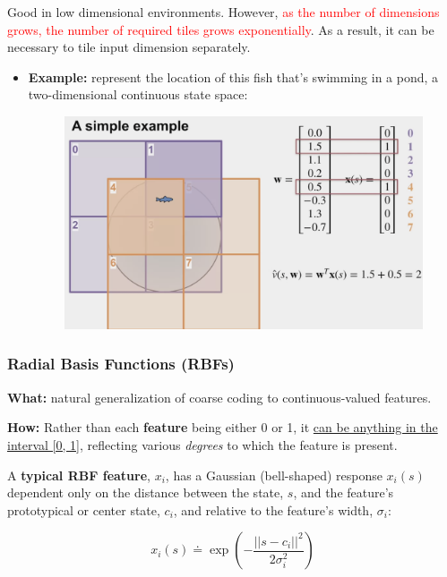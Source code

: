 \documentclass[12pt, a4paper]{article}
\begin{document}
Good in low dimensional environments. However, \textcolor{red}{as the number of dimensions grows, the number of required tiles grows exponentially}. As a result, it can be necessary to tile input dimension separately.

\begin{itemize}
  \item \textbf{Example:} represent the location of this fish that's swimming in a pond, a two-dimensional continuous state space:
  \begin{figure}[H]
    \centering
      \includegraphics[width=0.7\columnwidth]{images/tile-coding-eg.png}
      \label{fig:tile-coding-eg}
  \end{figure}
\end{itemize}














\subsubsection{Radial Basis Functions (RBFs)}\label{radial-basis-functions}

\textbf{What:} natural generalization of coarse coding to continuous-valued features.


\textbf{How:} Rather than each \textbf{feature} being either 0 or 1, it \uline{can be anything in the interval [0, 1]}, reflecting various \textit{degrees} to which the feature is present.

A \textbf{typical RBF feature}, $x_i$, has a Gaussian (bell-shaped) response $x_i(s)$ dependent only on the distance between the state, $s$, and the feature’s prototypical or center state, $c_i$, and relative to the feature’s width, $\sigma_i$:

$$
x_i(s) \doteq \exp{\left(-\frac{||s-c_i||^2}{2\sigma_i^2}\right)}
$$
\end{document}
